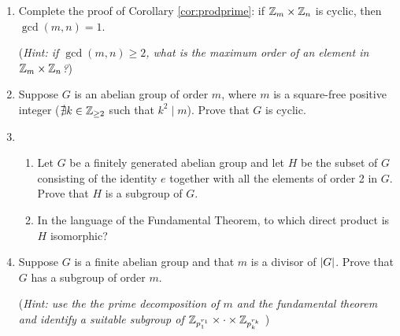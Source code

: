 \begin{tcolorbox}[exercisestyle,title={Exercises \thesection.\phantom{b}}]
\begin{enumerate}
	\item Complete the proof of Corollary \ref{cor:prodprime}: if $\mathbb{Z}_m\times\mathbb{Z}_n$ is cyclic, then $\gcd(m,n)=1$.\par
	(\emph{Hint: if $\gcd(m,n)\ge 2$, what is the maximum order of an element in $\mathbb{Z}_m\times\mathbb{Z}_n$?})

	\item Suppose $G$ is an abelian group of order $m$, where $m$ is a square-free positive integer ($\nexists k\in \mathbb{Z}_{\ge 2}$ such that $k^2\!\mid\! m$). Prove that $G$ is cyclic.


	\item\begin{enumerate}
  	\item Let $G$ be a finitely generated abelian group and let $H$ be the subset of $G$ consisting of the identity $e$ together with all the elements of order 2 in $G$. Prove that $H$ is a subgroup of $G$.
  	\item In the language of the Fundamental Theorem, to which direct product is $H$ isomorphic?
	\end{enumerate}
	
	
	\item\label{exs:abeliansubgroup} Suppose $G$ is a finite abelian group and that $m$ is a divisor of $\left| G\right|$. Prove that $G$ has a subgroup of order $m$.\par
	(\emph{Hint: use the the prime decomposition of $m$ and the fundamental theorem and identify a suitable subgroup of $\mathbb{Z}_{p_1^{r_1}}\times\cdot\times\mathbb{Z}_{p_k^{r_k}}$ })

\end{enumerate}
\end{tcolorbox}
